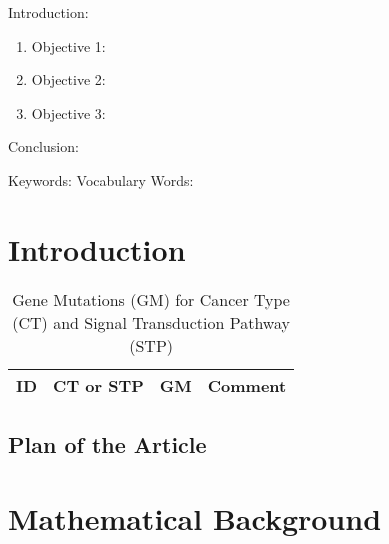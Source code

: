 
\twocolumn
\scriptsize
\begin{frontmatter}
		\title{}
		\author{}
		\address{The Mathematical Learning Space}
\end{frontmatter}	

Introduction:
\begin{enumerate}
\item Objective 1:
\item Objective 2:
\item Objective 3:
\end{enumerate}
Conclusion:

Keywords:
Vocabulary Words:

\section{Introduction}


\begin{table}[H]
\tiny
\caption{Gene Mutations (GM) for Cancer Type (CT) and Signal Transduction Pathway (STP)}
\begin{tabular}{rp{2cm}p{4cm}p{0.5cm}}
\hline 
ID & CT or STP & GM & Comment \\ 
\hline 	
\hline
\end{tabular}
\end{table}

\subsection{Plan of the Article}


\section{Mathematical Background}

